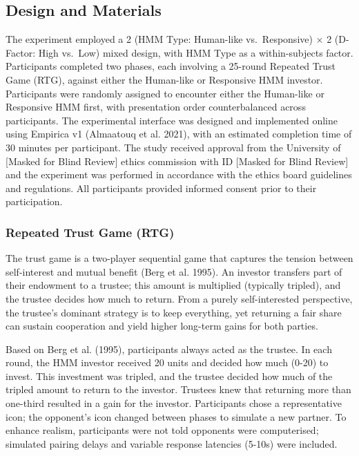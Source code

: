 \documentclass[
]{article}
\begin{document}
\subsection{Design and Materials}\label{design-and-materials}

The experiment employed a 2 (HMM Type: Human-like vs.~Responsive) × 2 (D-Factor: High vs.~Low) mixed design, with HMM Type as a within-subjects factor.
Participants completed two phases, each involving a 25-round Repeated Trust Game (RTG), against either the Human-like or Responsive HMM investor. Participants were randomly assigned to encounter either the Human-like or Responsive HMM first, with presentation order counterbalanced across participants.
The experimental interface was designed and implemented online using Empirica v1 (Almaatouq et al. 2021), with an estimated completion time of 30 minutes per participant.
The study received approval from the University of {[}Masked for Blind Review{]} ethics commission with ID {[}Masked for Blind Review{]} and the experiment was performed in accordance with the ethics board guidelines and regulations.
All participants provided informed consent prior to their participation.

\subsubsection{Repeated Trust Game (RTG)}\label{repeated-trust-game-rtg}

The trust game is a two-player sequential game that captures the tension between self-interest and mutual benefit (Berg et al. 1995). An investor transfers part of their endowment to a trustee; this amount is multiplied (typically tripled), and the trustee decides how much to return. From a purely self-interested perspective, the trustee's dominant strategy is to keep everything, yet returning a fair share can sustain cooperation and yield higher long-term gains for both parties.

Based on Berg et al. (1995), participants always acted as the trustee.
In each round, the HMM investor received 20 units and decided how much (0-20) to invest.
This investment was tripled, and the trustee decided how much of the tripled amount to return to the investor.
Trustees knew that returning more than one-third resulted in a gain for the investor.
Participants chose a representative icon; the opponent's icon changed between phases to simulate a new partner.
To enhance realism, participants were not told opponents were computerised; simulated pairing delays and variable response latencies (5-10s) were included.
\end{document}

